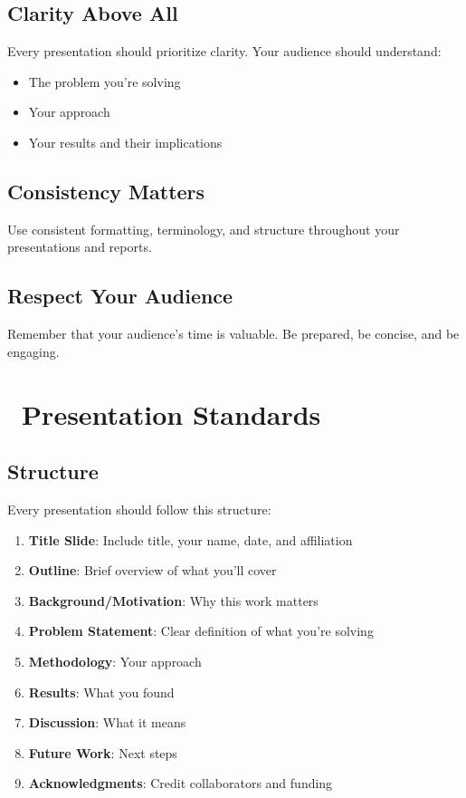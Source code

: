 \documentclass[11pt,a4paper]{article}
\begin{document}
\subsection{Clarity Above All}
Every presentation should prioritize clarity. Your audience should understand:
\begin{itemize}
    \item The problem you're solving
    \item Your approach
    \item Your results and their implications
\end{itemize}

\subsection{Consistency Matters}
Use consistent formatting, terminology, and structure throughout your presentations and reports.

\subsection{Respect Your Audience}
Remember that your audience's time is valuable. Be prepared, be concise, and be engaging.

\section{\faChalkboardTeacher~Presentation Standards}

\subsection{Structure}
Every presentation should follow this structure:
\begin{enumerate}
    \item \textbf{Title Slide}: Include title, your name, date, and affiliation
    \item \textbf{Outline}: Brief overview of what you'll cover
    \item \textbf{Background/Motivation}: Why this work matters
    \item \textbf{Problem Statement}: Clear definition of what you're solving
    \item \textbf{Methodology}: Your approach
    \item \textbf{Results}: What you found
    \item \textbf{Discussion}: What it means
    \item \textbf{Future Work}: Next steps
    \item \textbf{Acknowledgments}: Credit collaborators and funding
\end{enumerate}
\end{document}
